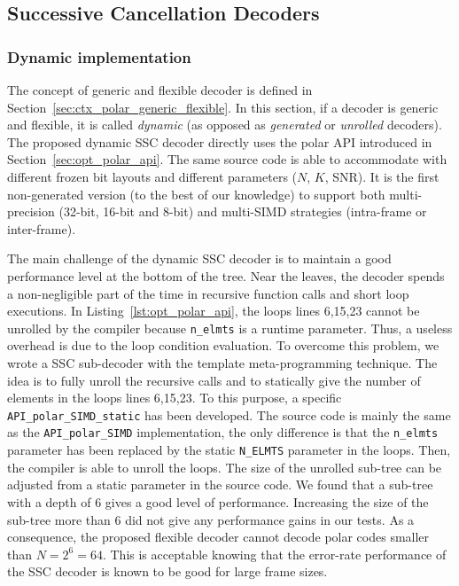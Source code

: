 \subsection{Successive Cancellation Decoders}

\subsubsection{Dynamic implementation}

The concept of generic and flexible decoder is defined in
Section~\ref{sec:ctx_polar_generic_flexible}. In this section, if a decoder is
generic and flexible, it is called \emph{dynamic} (as opposed as
\emph{generated} or \emph{unrolled} decoders). The proposed dynamic SSC decoder
directly uses the polar API introduced in Section~\ref{sec:opt_polar_api}. The
same source code is able to accommodate with different frozen bit layouts and
different parameters ($N$, $K$, SNR). It is the first non-generated version (to
the best of our knowledge) to support both multi-precision (32-bit, 16-bit and
8-bit) and multi-SIMD strategies (intra-frame or inter-frame).

The main challenge of the dynamic SSC decoder is to maintain a good performance
level at the bottom of the tree. Near the leaves, the decoder spends a
non-negligible part of the time in recursive function calls and short loop
executions. In Listing~\ref{lst:opt_polar_api}, the loops lines 6,15,23 cannot
be unrolled by the compiler because \verb|n_elmts| is a runtime parameter. Thus,
a useless overhead is due to the loop condition evaluation. To overcome this
problem, we wrote a SSC sub-decoder with the template meta-programming
technique. The idea is to fully unroll the recursive calls and to statically
give the number of elements in the loops lines 6,15,23. To this purpose, a
specific \verb|API_polar_SIMD_static| has been developed. The source code is
mainly the same as the \verb|API_polar_SIMD| implementation, the only difference
is that the \verb|n_elmts| parameter has been replaced by the static
\verb|N_ELMTS| parameter in the loops. Then, the compiler is able to unroll
the loops. The size of the unrolled sub-tree can be adjusted from a static
parameter in the source code. We found that a sub-tree with a depth of 6 gives
a good level of performance. Increasing the size of the sub-tree more than 6 did
not give any performance gains in our tests. As a consequence, the proposed
flexible decoder cannot decode polar codes smaller than $N = 2^6 = 64$. This is
acceptable knowing that the error-rate performance of the SSC decoder is known
to be good for large frame sizes.

